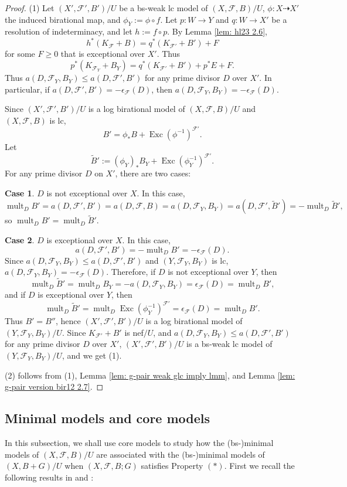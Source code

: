 \documentclass[11pt]{amsart}
\numberwithin{equation}{section}
\newcommand{\Exc}{\operatorname{Exc}}
\newcommand{\mult}{\operatorname{mult}}
\newcommand{\Ff}{\mathcal{F}}
\theoremstyle{definition}
\theoremstyle{definition}
\theoremstyle{definition}
\begin{document}
\begin{proof}
(1) Let $(X',\Ff',B')/U$ be a bs-weak lc model of $(X,\Ff,B)/U$, $\phi: X\dashrightarrow X'$ the induced birational map, and $\phi_Y:=\phi\circ f$. Let $p: W\rightarrow Y$ and $q: W\rightarrow X'$ be a resolution of indeterminacy, and let $h:=f\circ p$. By Lemma \ref{lem: hl23 2.6},
$$h^*(K_\Ff+B)=q^*(K_{\Ff'}+B')+F$$
for some $F\geq 0$ that is exceptional over $X'$. Thus 
$$p^*(K_{\Ff_Y}+B_Y)=q^*(K_{\Ff'}+B')+p^*E+F.$$
Thus $a(D,\Ff_Y,B_Y)\leq a(D,\Ff',B')$ for any prime divisor $D$ over $X'$. In particular, if $a(D,\Ff',B')=-\epsilon_{\Ff}(D)$, then $a(D,\Ff_Y,B_Y)=-\epsilon_{\Ff}(D)$.

Since $(X',\Ff',B')/U$ is a log birational model of $(X,\Ff,B)/U$ and $(X,\Ff,B)$ is lc, $$B'=\phi_*B+\Exc(\phi^{-1})^{\Ff'}.$$ 
Let 
$$\tilde B':=(\phi_Y)_*B_Y+\Exc(\phi_Y^{-1})^{\Ff'}.$$ For any prime divisor $D$ on $X'$, there are two cases:

\medskip

\noindent\textbf{Case 1}. $D$ is not exceptional over $X$. In this case,
$$\mult_DB'=a(D,\Ff',B')=a(D,\Ff,B)=a(D,\Ff_Y,B_Y)=a(D,\Ff',\tilde B')=-\mult_D\tilde B',$$
so $\mult_DB'=\mult_D\tilde B'$.

\medskip

\noindent\textbf{Case 2}. $D$ is exceptional over $X$. In this case, 
$$a(D,\Ff',B')=-\mult_DB'=-\epsilon_{\Ff}(D).$$
Since $a(D,\Ff_Y,B_Y)\leq a(D,\Ff',B')$ and $(Y,\Ff_Y,B_Y)$ is lc, $a(D,\Ff_Y,B_Y)=-\epsilon_{\Ff}(D)$. Therefore, if $D$ is not exceptional over $Y$, then
$$\mult_D\tilde B'=\mult_DB_Y=-a(D,\Ff_Y,B_Y)=\epsilon_{\Ff}(D)=\mult_DB',$$
and if $D$ is exceptional over $Y$, then
$$\mult_D\tilde B'=\mult_D\Exc(\phi_Y^{-1})^{\Ff'}=\epsilon_{\Ff}(D)=\mult_DB'.$$
Thus $B'=B''$, hence $(X',\Ff',B')/U$ is a log birational model of $(Y,\Ff_Y,B_Y)/U$. Since $K_{\Ff'}+B'$ is nef$/U$, and
$a(D,\Ff_Y,B_Y)\leq a(D,\Ff',B')$ for any prime divisor $D$ over $X'$, $(X',\Ff',B')/U$ is a bs-weak lc model of $(Y,\Ff_Y,B_Y)/U$, and we get (1).

(2) follows from (1), Lemma \ref{lem: g-pair weak glc imply lmm}, and Lemma \ref{lem: g-pair version bir12 2.7}.
\end{proof}


\subsection{Minimal models and core models}

In this subsection, we shall use core models to study how the (bs-)minimal models of $(X,\Ff,B)/U$ are associated with the (bs-)minimal models of $(X,B+G)/U$ when $(X,\Ff,B
;G)$ satisfies Property $(*)$. First we recall the following results in \cite{CHLX23} and \cite{HH20}:
\end{document}
